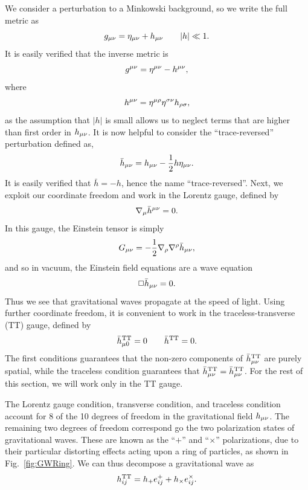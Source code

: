 We consider a perturbation to a Minkowski background, so we write the full metric as
\begin{equation}
g_{\mu\nu}=\eta_{\mu\nu} + h_{\mu\nu}\qquad|h|\ll 1.
\end{equation}
It is easily verified that the inverse metric is
\begin{equation}
g^{\mu\nu}=\eta^{\mu\nu}-h^{\mu\nu},
\end{equation}
where 
\begin{equation}
h^{\mu\nu}=\eta^{\mu\rho}\eta^{\sigma\nu}h_{\rho\sigma},
\end{equation}
as the assumption that $|h|$ is small allows us to neglect terms that are higher than first order in $h_{\mu\nu}$. It is now helpful to consider the ``trace-reversed'' perturbation defined as,
\begin{equation}
\bar{h}_{\mu\nu}=h_{\mu\nu}-\frac{1}{2}h\eta_{\mu\nu}.
\end{equation}
It is easily verified that $\bar{h}=-h$, hence the name ``trace-reversed''. Next, we exploit our coordinate freedom and work in the Lorentz gauge, defined by
\begin{equation}
\nabla_{\mu}\bar{h}^{\mu\nu}=0.
\end{equation}
In this gauge, the Einstein tensor is simply
\begin{equation}
G_{\mu\nu}=-\frac{1}{2}\nabla_{\rho}\nabla^{\rho}\bar{h}_{\mu\nu},
\end{equation}
and so in vacuum, the Einstein field equations are a wave equation
\begin{equation}
\Box\bar{h}_{\mu\nu}=0.
\end{equation}
Thus we see that gravitational waves propagate at the speed of light. Using further coordinate freedom, it is convenient to work in the traceless-transverse (TT) gauge, defined by
\begin{equation}
\bar{h}_{\mu0}^{\rm{TT}}=0\qquad \bar{h}^{\rm{TT}}=0.
\end{equation}
The first conditions guarantees that the non-zero components of $\bar{h}_{\mu\nu}^{\rm{TT}}$ are purely spatial, while the traceless condition guarantees that $\bar{h}_{\mu\nu}^{\rm{TT}}=\bar{h}_{\mu\nu}^{\rm{TT}}$. For the rest of this section, we will work only in the TT gauge.

The Lorentz gauge condition, transverse condition, and traceless condition account for 8 of the 10 degrees of freedom in the gravitational field $h_{\mu\nu}$. The remaining two degrees of freedom correspond go the two polarization states of gravitational waves. These are known as the ``$+$'' and ``$\times$'' polarizations, due to their particular distorting effects acting upon a ring of particles, as shown in Fig.~\ref{fig:GWRing}. We can thus decompose a gravitational wave as
\begin{equation}
h_{ij}^{\rm{TT}}=h_{+}e^{+}_{ij}+h_{\times}e_{ij}^{\times}.
\end{equation}

